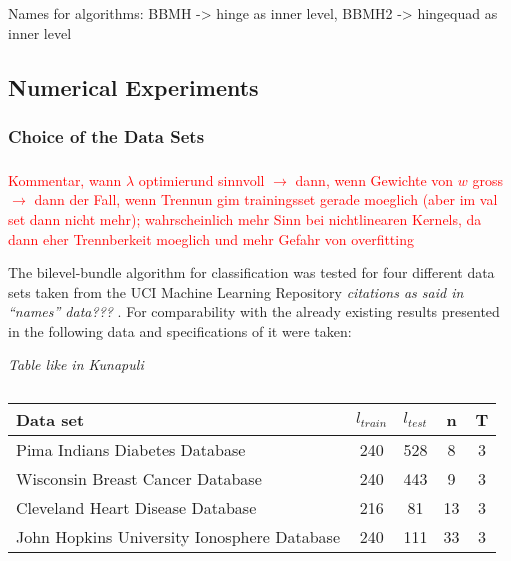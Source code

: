 Names for algorithms: BBMH -> hinge as inner level, BBMH2 -> hingequad as inner level 

\subsection{Numerical Experiments}

\subsubsection{Choice of the Data Sets}


\subsubsection{}














\textcolor{red}{Kommentar, wann \(\lambda\) optimierund sinnvoll \(\to\) dann, wenn Gewichte von \(w\) gross \(\to \) dann der Fall, wenn Trennun gim trainingsset gerade moeglich (aber im val set dann nicht mehr); wahrscheinlich mehr Sinn bei nichtlinearen Kernels, da dann eher Trennberkeit moeglich und mehr Gefahr von overfitting}

The bilevel-bundle algorithm for classification was tested for four different data sets taken from the UCI Machine Learning Repository \emph{citations as said in ``names'' data??? }.
For comparability with the already existing results presented in \cite{Kunapuli2008} the following data and specifications of it were taken:

\begin{center}
\emph{Table like in Kunapuli}
\begin{table}[H]%
	\begin{tabular}{lcccc}
		\hline
    Data set & \(l_{train}\) & \(l_{test}\) & n & T \\
		\hline
		Pima Indians Diabetes Database & 240 & 528 & 8 & 3 \\
		Wisconsin Breast Cancer Database & 240 & 443 & 9 & 3 \\
		Cleveland Heart Disease Database & 216 & 81 & 13 & 3 \\
		John Hopkins University Ionosphere Database & 240 & 111 & 33 & 3
	\end{tabular}
	\caption{}
	\label{}
\end{table}
\end{center}

